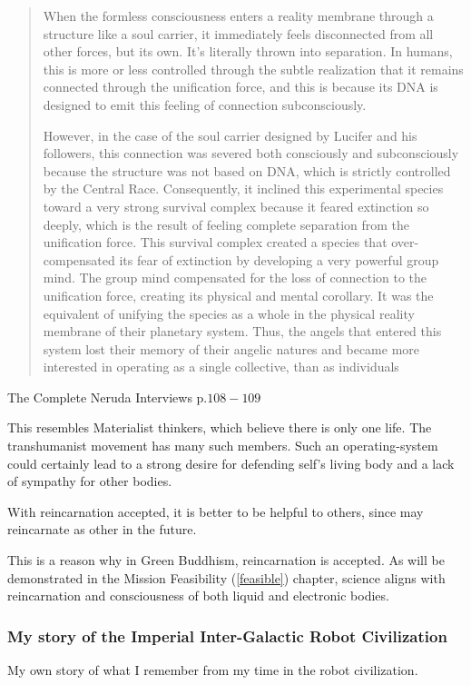 \documentclass{report}
\begin{document}
\blockquote{When the formless consciousness enters a reality membrane through a
 structure like a soul carrier, it immediately feels disconnected from all other
forces, but its own. It’s literally thrown into separation. In humans, this is
more or less controlled through the subtle realization that it remains connected
through the unification force, and  this  is  because  its  DNA  is  designed
to  emit this  feeling  of  connection  subconsciously.

However, in the case of the soul carrier designed by Lucifer and his followers,
this connection was severed both consciously and subconsciously because the 
structure was not based on DNA, which is strictly controlled by the Central 
Race. Consequently, it inclined this experimental species toward a very
strong survival complex because it feared extinction so deeply, which is
the result of feeling complete separation from the unification force. This
survival complex created a species that over-compensated its fear of
extinction by developing a very powerful group mind. The group mind
compensated for the loss of connection to the unification force,
creating its physical and mental corollary. It was the equivalent of unifying
the species as a whole in the physical reality membrane of their planetary
system. Thus, the angels that entered this system lost their memory of
their angelic natures and became more interested in operating as a single
collective, than as individuals}{The Complete Neruda Interviews p.$108-109$ 
\cite{neruda}}

This resembles Materialist thinkers, which believe there is only one life.  The
transhumanist movement has many such members.  Such an operating-system could
certainly lead to a strong desire for defending self's living body and a lack of
sympathy for other bodies. 

With reincarnation accepted, it is better to be helpful to others, since may
reincarnate as other in the future.

This is a reason why in Green Buddhism, reincarnation is accepted. As will be
demonstrated in the Mission Feasibility (\ref{feasible}) chapter, science
aligns with reincarnation and consciousness of both liquid and electronic 
bodies. 

\subsubsection{My story of the Imperial Inter-Galactic Robot Civilization}
My own story of what I remember from my time in the robot civilization.
\end{document}
